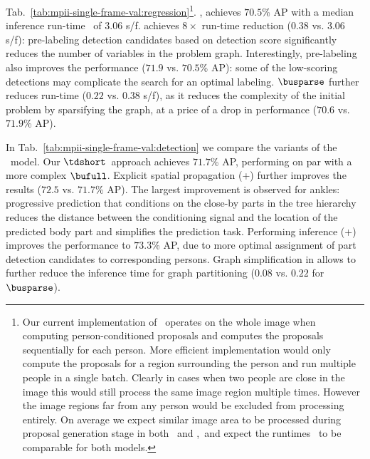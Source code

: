 Tab.~\ref{tab:mpii-single-frame-val:regression}\footnote{\label{cnntime}Our current implementation
  of \tdbushort~operates on the whole image when computing person-conditioned proposals and computes
  the proposals sequentially for each person. More efficient implementation would only compute the
  proposals for a region surrounding the person and run multiple people in a single batch. Clearly
  in cases when two people are close in the image this would still process the same image region
  multiple times. However the image regions far from any person would be excluded from processing
  entirely. On average we expect similar image area to be processed during proposal generation stage
  in both \tdbushort~and \busparse,~and expect the runtimes \timecnn~to be comparable for both
  models.}.  \bufull,  achieves $70.5$\% AP with a median inference run-time
\timeinfer~of $3.06$ s/f. \bufull{} achieves $8\times$ run-time reduction ($0.38$ vs. $3.06$ s/f):
pre-labeling detection candidates based on detection score significantly reduces the number of
variables in the problem graph. Interestingly, pre-labeling also improves the performance ($71.9$
vs. $70.5$\% AP): some of the low-scoring detections may complicate the search for an optimal
labeling. $\busparse$ further reduces run-time ($0.22$ vs. $0.38$ s/f), as
it reduces the complexity of the initial problem by sparsifying the graph, at a price of a drop in
performance ($70.6$ vs. $71.9$\% AP).


In Tab.~\ref{tab:mpii-single-frame-val:detection} we compare the variants of the \tdbushort~model.
Our $\tdshort$~approach achieves $71.7$\% AP, performing on par with a more complex $\bufull$. 
Explicit spatial propagation
(\tdshort{}+\spatprop ) further improves the results ($72.5$ vs. $71.7$\% AP). The largest
improvement is observed for ankles: progressive prediction that conditions on the close-by parts in
the tree hierarchy reduces the distance between the conditioning signal and the location of the
predicted body part and simplifies the prediction task. Performing inference
(\tdbushort{}+\spatprop) improves the performance to $73.3$\% AP, due to more optimal assignment of
part detection candidates to corresponding persons. Graph simplification in \tdbushort{}
 allows to further reduce the inference time for graph partitioning ($0.08$ vs. $0.22$ for
$\busparse$).


